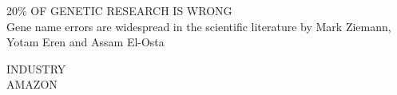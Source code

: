 \documentclass{beamer}
\theoremstyle{definition}
\begin{document}
\begin{frame}
\begin{figure}[width=\textwidth]
    
\end{figure}
\end{frame}

\begin{frame}
     \begin{center}
     \Huge{20\% OF GENETIC RESEARCH IS WRONG} \\
     \vspace{10mm}
     \tiny{Gene name errors are widespread in the scientific literature by
     Mark Ziemann, Yotam Eren and Assam El-Osta}
     \end{center}
\end{frame}

\begin{frame}
\begin{center}
     \Huge{INDUSTRY} \\
     \pause
     \vspace{10mm}
     \Huge{AMAZON}
     \end{center}
\end{frame}

\end{document}
